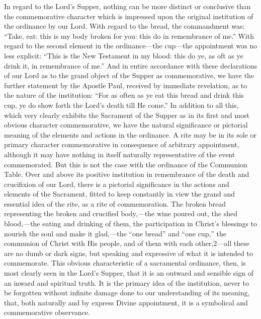 \documentclass[]{book}
\begin{document}
In regard to the Lord's Supper, nothing can be more distinct or conclusive than the commemorative character which is impressed upon the original institution of the ordinance by our Lord. With regard to the bread, the commandment was: ``Take, eat: this is my body broken for you: this do in remembrance of me.'' With regard to the second element in the ordinance---the cup---the appointment was no less explicit: ``This is the New Testament in my blood: this do ye, as oft as ye drink it, in remembrance of me.'' And in entire accordance with these declarations of our Lord as to the grand object of the Supper as commemorative, we have the further statement by the Apostle Paul, received by immediate revelation, as to the nature of the institution: ``For as often as ye eat this bread and drink this cup, ye do show forth the Lord's death till He come.'' In addition to all this, which very clearly exhibits the Sacrament of the Supper as in its first and most obvious character commemorative, we have the natural significance or pictorial meaning of the elements and actions in the ordinance. A rite may be in its sole or primary character commemorative in consequence of arbitrary appointment, although it may have nothing in itself naturally representative of the event commemorated. But this is not the case with the ordinance of the Communion Table. Over and above its positive institution in remembrance of the death and crucifixion of our Lord, there is a pictorial significance in the actions and elements of the Sacrament, fitted to keep constantly in view the grand and essential idea of the rite, as a rite of commemoration. The broken bread representing the broken and crucified body,---the wine poured out, the shed blood,---the eating and drinking of them, the participation in Christ's blessings to nourish the soul and make it glad,---the ``one bread'' and ``one cup,'' the communion of Christ with His people, and of them with each other,2---all these are no dumb or dark signs, but speaking and expressive of what it is intended to commemorate. This obvious characteristic of a sacramental ordinance, then, is most clearly seen in the Lord's Supper, that it is an outward and sensible sign of an inward and spiritual truth. It is the primary idea of the institution, never to be forgotten without infinite damage done to our understanding of its meaning, that, both naturally and by express Divine appointment, it is a symbolical and commemorative observance.
\end{document}
